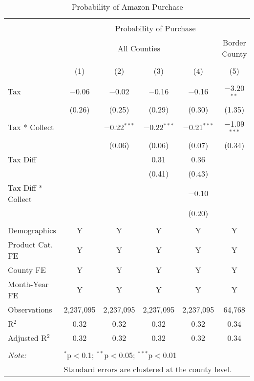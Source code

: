 
\begin{table}[!htbp] \centering 
  \caption{Probability of Amazon Purchase} 
  \label{tab:amazonProb} 
\begin{tabular}{@{\extracolsep{5pt}}lccccc} 
\\[-1.8ex]\hline 
\hline \\[-1.8ex] 
 & \multicolumn{5}{c}{Probability of Purchase} \\ 
\cline{2-6} 
 & \multicolumn{4}{c}{All Counties} & Border County \\ 
\\[-1.8ex] & (1) & (2) & (3) & (4) & (5)\\ 
\hline \\[-1.8ex] 
 Tax & $-$0.06 & $-$0.02 & $-$0.16 & $-$0.16 & $-$3.20$^{**}$ \\ 
  & (0.26) & (0.25) & (0.29) & (0.30) & (1.35) \\ 
  Tax * Collect &  & $-$0.22$^{***}$ & $-$0.22$^{***}$ & $-$0.21$^{***}$ & $-$1.09$^{***}$ \\ 
  &  & (0.06) & (0.06) & (0.07) & (0.34) \\ 
  Tax Diff &  &  & 0.31 & 0.36 &  \\ 
  &  &  & (0.41) & (0.43) &  \\ 
  Tax Diff * Collect &  &  &  & $-$0.10 &  \\ 
  &  &  &  & (0.20) &  \\ 
 \hline \\[-1.8ex] 
Demographics & Y & Y & Y & Y & Y \\ 
Product Cat. FE & Y & Y & Y & Y & Y \\ 
County FE & Y & Y & Y & Y & Y \\ 
Month-Year FE & Y & Y & Y & Y & Y \\ 
Observations & 2,237,095 & 2,237,095 & 2,237,095 & 2,237,095 & 64,768 \\ 
R$^{2}$ & 0.32 & 0.32 & 0.32 & 0.32 & 0.34 \\ 
Adjusted R$^{2}$ & 0.32 & 0.32 & 0.32 & 0.32 & 0.34 \\ 
\hline 
\hline \\[-1.8ex] 
\textit{Note:}  & \multicolumn{5}{l}{$^{*}$p$<$0.1; $^{**}$p$<$0.05; $^{***}$p$<$0.01} \\ 
 & \multicolumn{5}{l}{Standard errors are clustered at the county level.} \\ 
\end{tabular} 
\end{table} 
